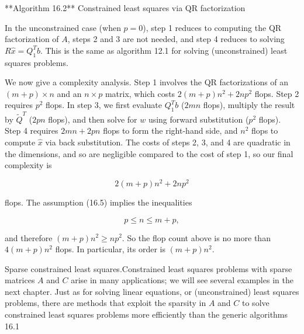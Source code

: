 

**Algorithm 16.2** Constrained least squares via QR factorization

In the unconstrained case (when \(p=0\)), step 1 reduces to computing the QR factorization of \(A\), steps 2 and 3 are not needed, and step 4 reduces to solving \(R\hat{x}=Q_{1}^{T}b\). This is the same as algorithm 12.1 for solving (unconstrained) least squares problems.

We now give a complexity analysis. Step 1 involves the QR factorizations of an \((m+p)\times n\) and an \(n\times p\) matrix, which costs \(2(m+p)n^{2}+2np^{2}\) flops. Step 2 requires \(p^{2}\) flops. In step 3, we first evaluate \(Q_{1}^{T}b\) (\(2mn\) flops), multiply the result by \(\tilde{Q}^{T}\) (\(2pn\) flops), and then solve for \(w\) using forward substitution (\(p^{2}\) flops). Step 4 requires \(2mn+2pn\) flops to form the right-hand side, and \(n^{2}\) flops to compute \(\hat{x}\) via back substitution. The costs of steps 2, 3, and 4 are quadratic in the dimensions, and so are negligible compared to the cost of step 1, so our final complexity is

\[2(m+p)n^{2}+2np^{2}\]

flops. The assumption (16.5) implies the inequalities

\[p\leq n\leq m+p,\]

and therefore \((m+p)n^{2}\geq np^{2}\). So the flop count above is no more than \(4(m+p)n^{2}\) flops. In particular, its order is \((m+p)n^{2}\).

Sparse constrained least squares.Constrained least squares problems with sparse matrices \(A\) and \(C\) arise in many applications; we will see several examples in the next chapter. Just as for solving linear equations, or (unconstrained) least squares problems, there are methods that exploit the sparsity in \(A\) and \(C\) to solve constrained least squares problems more efficiently than the generic algorithms 16.1
